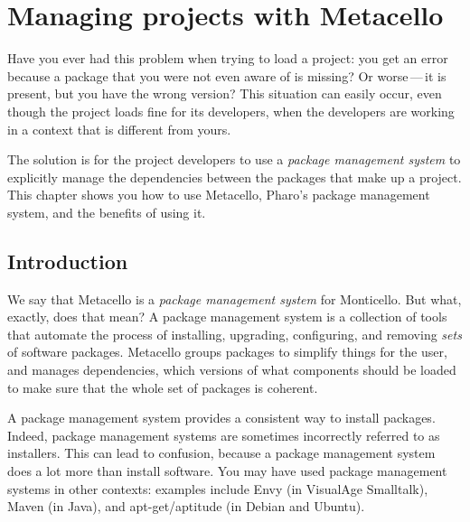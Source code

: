 \documentclass[a4paper,10pt,twoside]{book}
\begin{document}
\fi
\sloppy



\chapter{Managing projects with Metacello}
\chapterauthor{\authordale{} \\ \authormariano{}}

\noindent
Have you ever had this problem when trying to load a project: you get an error because a package that you were not even aware of is missing?  Or worse\,---\,it is present, but you have the wrong version? This situation can easily occur, even though the project loads fine for its developers, when the developers are working in a context that is different from yours. 

The solution is for the project developers to use a \emph{package management system} to explicitly manage the dependencies between the packages that make up a project.  
This chapter shows you how to use Metacello, Pharo's package management system, and the benefits of using it. 

\section{Introduction}

We say that Metacello is a \emph{package management system} for Monticello. 
But what, exactly, does that mean?
A package management system is a collection of tools that automate the process of installing, upgrading, configuring, and removing \emph{sets} of software packages. Metacello groups packages to simplify things for the user, and manages dependencies, \ie which versions of what components should be loaded to make sure that the whole set of packages is coherent. 

A package management system provides a consistent way to install packages. 
Indeed, package management systems are sometimes incorrectly referred to as installers. This can lead to confusion, because a package management system does a lot more than install software.  You may have used package management systems in other contexts: examples include Envy (in VisualAge Smalltalk), Maven (in Java), and apt-get/aptitude (in Debian and Ubuntu).
\end{document}

